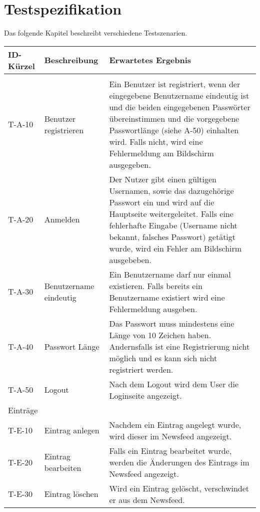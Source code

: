 
\chapter{Testspezifikation}
Das folgende Kapitel beschreibt verschiedene Testszenarien.



\begin{tabularx}{\textwidth}{|l|X|X|}
    \toprule
    \textbf{ID-Kürzel} & \textbf{Beschreibung} & \textbf{Erwartetes Ergebnis} \\
    \midrule
    \endhead
    \hline
    \caption{Testspezifikationen}
    
    \endfoot
    \multicolumn{3}{|l|}{Authentifizierung}\\ \hline
    T-A-10 & Benutzer registrieren & Ein Benutzer ist registriert, wenn der eingegebene Benutzername eindeutig ist und die beiden eingegebenen Passwörter übereinstimmen und die vorgegebene Passwortlänge (siehe A-50) einhalten wird. Falls nicht, wird eine Fehlermeldung am Bildschirm ausgegeben. \\ \hline
    T-A-20 & Anmelden &  Der Nutzer gibt einen gültigen Usernamen, sowie das dazugehörige Passwort ein und wird auf die Hauptseite weitergeleitet. \newline Falls eine fehlerhafte Eingabe (Username nicht bekannt, falsches Passwort) getätigt wurde, wird ein Fehler am Bildschirm ausgebeben.\\ \hline
    T-A-30 & Benutzername eindeutig & Ein Benutzername darf nur einmal existieren. Falls bereits ein Benutzername existiert wird eine Fehlermeldung ausgeben.\\ \hline
    T-A-40 & Passwort Länge & Das Passwort muss mindestens eine Länge von 10 Zeichen haben. Andernsfalls ist eine Registrierung nicht möglich und es kann sich nicht registriert werden.  \\\hline
    T-A-50 & Logout & Nach dem Logout wird dem User die Loginseite angezeigt.\\ \hline
    \multicolumn{3}{|l|}{Einträge}\\ \hline
    T-E-10 & Eintrag anlegen &  Nachdem ein Eintrag angelegt wurde, wird dieser im Newsfeed angezeigt. \\\hline
   	T-E-20 & Eintrag bearbeiten & Falls ein Eintrag bearbeitet wurde, werden die Änderungen des Eintrags im Newsfeed angezeigt. \\\hline
    T-E-30 & Eintrag löschen &  Wird ein Eintrag gelöscht, verschwindet er aus dem Newsfeed.\\\hline

\end{tabularx}
